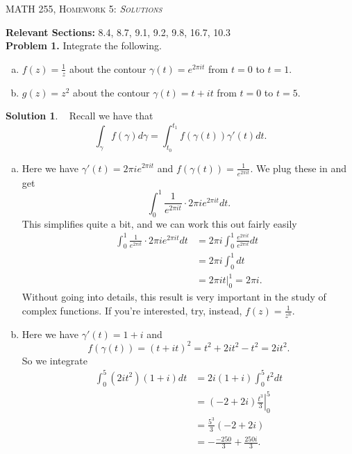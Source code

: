 \documentclass[12pt]{report} %
\theoremstyle{definition}
\newtheorem{solution}{Solution}
\begin{document}
\begin{center}
   \textsc{\large MATH 255, Homework 5: \emph{Solutions}}\\
\end{center}
\vspace{.5cm}

\noindent\textbf{Relevant Sections:} 8.4, 8.7, 9.1, 9.2, 9.8, 16.7, 10.3 \\

\noindent\textbf{Problem 1.} Integrate the following.
\begin{enumerate}[(a)]
    \item $f(z)=\frac{1}{z}$ about the contour $\gamma(t)=e^{2\pi it}$ from $t=0$ to $t=1$.
    \item $g(z)=z^2$ about the contour $\gamma(t)=t+it$ from $t=0$ to $t=5$.
\end{enumerate}

\begin{solution}~
Recall we have that
\[
\int_\gamma f(\gamma) d\gamma = \int_{t_0}^{t_1} f(\gamma(t))\gamma'(t)dt.
\]
\begin{enumerate}[(a)]
    \item Here we have $\gamma'(t)=2\pi i e^{2\pi i t}$ and $f(\gamma(t))=\frac{1}{e^{2\pi i t}}$. We plug these in and get
    \[
    \int_0^1 \frac{1}{e^{2\pi i t}} \cdot 2\pi i e^{2\pi i t}dt.
    \]
    This simplifies quite a bit, and we can work this out fairly easily
    \begin{align*}
        \int_0^1 \frac{1}{e^{2\pi i t}} \cdot 2\pi i e^{2\pi i t}dt & = 2\pi i \int_0^1 \frac{e^{2\pi i t}}{e^{2\pi i t}} dt \\
        &= 2\pi i \int_0^1 dt\\
        &= \left. 2 \pi i t \right|_0^1 = 2\pi i.
    \end{align*}
    Without going into details, this result is very important in the study of complex functions.  If you're interested, try, instead, $f(z)=\frac{1}{z^n}$.
    \item Here we have $\gamma'(t)=1+i$ and 
    \[
    f(\gamma(t))=(t+it)^2 = t^2+2it^2-t^2 = 2it^2.
    \]
    So we integrate
    \begin{align*}
        \int_0^5 (2it^2)(1+i)dt&= 2i(1+i)\int_0^5 t^2 dt\\
        &= \left. (-2+2i) \frac{t^3}{3}\right|_0^5\\
        &= \frac{5^3}{3}(-2+2i)\\
        &= -\frac{-250}{3}+\frac{250i}{3}.
    \end{align*}
\end{enumerate}
\end{solution}
\end{document}
